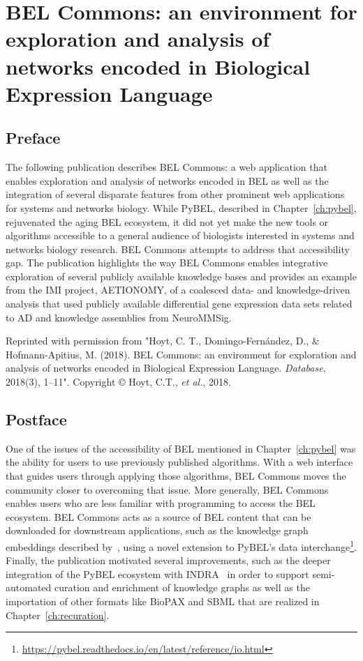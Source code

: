 \chapter{BEL Commons: an environment for exploration and analysis of networks encoded in Biological Expression Language}\label{ch:belcommons}

\section*{Preface}

The following publication describes BEL Commons: a web application that enables exploration and analysis of networks encoded in \ac{BEL} as well as the integration of several disparate features from other prominent web applications for systems and networks biology.
While PyBEL, described in Chapter~\ref{ch:pybel}, rejuvenated the aging \ac{BEL} ecosystem, it did not yet make the new tools or algorithms accessible to a general audience of biologists interested in systems and networks biology research.
BEL Commons attempts to address that accessibility gap.
The publication highlights the way BEL Commons enables integrative exploration of several publicly available knowledge bases and provides an example from the \ac{IMI} project, AETIONOMY, of a coalesced data- and knowledge-driven analysis that used publicly available differential gene expression data sets related to \ac{AD} and knowledge assemblies from NeuroMMSig\cite{Domingo-Fernandez2017}.

\vspace*{\fill}

Reprinted with permission from "Hoyt, C. T., Domingo-Fern\'{a}ndez, D., \& Hofmann-Apitius, M. (2018). BEL Commons: an environment for exploration and analysis of networks encoded in Biological Expression Language. \textit{Database}, 2018(3), 1–11".
Copyright © Hoyt, C.T., \textit{et al.}, 2018.



\section*{Postface}

One of the issues of the accessibility of \ac{BEL} mentioned in Chapter~\ref{ch:pybel} was the ability for users to use previously published algorithms.
With a web interface that guides users through applying those algorithms, BEL Commons moves the community closer to overcoming that issue.
More generally, BEL Commons enables users who are less familiar with programming to access the \ac{BEL} ecosystem.
BEL Commons acts as a source of BEL content that can be downloaded for downstream applications, such as the knowledge graph embeddings described by~\cite{Ali2019}, using a novel extension to PyBEL's data interchange\footnote{\url{https://pybel.readthedocs.io/en/latest/reference/io.html}}.
Finally, the publication motivated several improvements, such as the deeper integration of the PyBEL ecosystem with \ac{INDRA}~\cite{Gyori2017} in order to support semi-automated curation and enrichment of knowledge graphs as well as the importation of other formats like \ac{BioPAX} and \ac{SBML} that are realized in Chapter~\ref{ch:recuration}.

